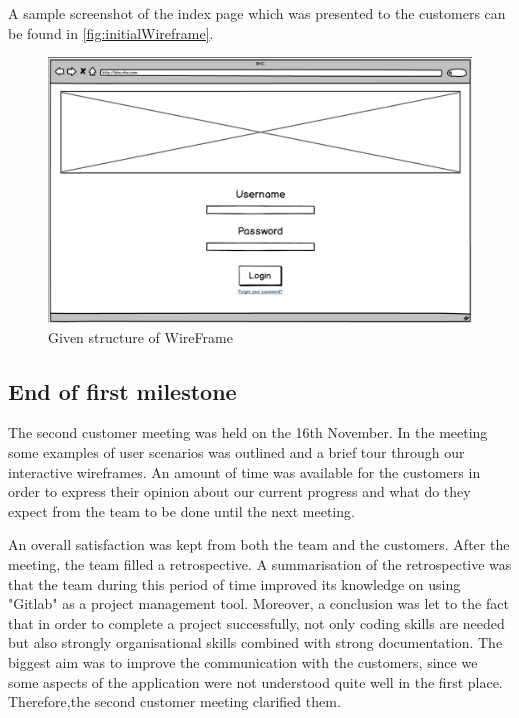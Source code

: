 \documentclass{l3proj}
\begin{document}
A sample screenshot of the index page which was presented to the customers can be found in \autoref{fig:initialWireframe}.

\begin{figure}[h]
\centerline{\includegraphics[width=\textwidth, height=\textheight, keepaspectratio]{wireframe.png}}
\caption{Given structure of WireFrame}
\label{fig:initialWireframe}
\end{figure}



\subsection{End of first milestone}
\label{sec:milestone1}

The second customer meeting was held on the 16th November. In the meeting some examples of user scenarios was outlined and a brief tour through our interactive wireframes. An amount of time was available for the customers in order to express their opinion about our current progress and what do they expect from the team to be done until the next meeting.

An overall satisfaction was kept from both the team and the customers. After the meeting, the team filled a retrospective. A summarisation of the retrospective was that the team during this period of time improved its knowledge on using "Gitlab" as a project management tool. Moreover, a conclusion was let to the fact that in order to complete a project successfully, not only coding skills are needed but also strongly organisational skills combined with strong documentation. The biggest aim was to improve the communication with the customers, since we some aspects of the application were not understood quite well in the first place. Therefore,the second customer meeting clarified them.
\end{document}
